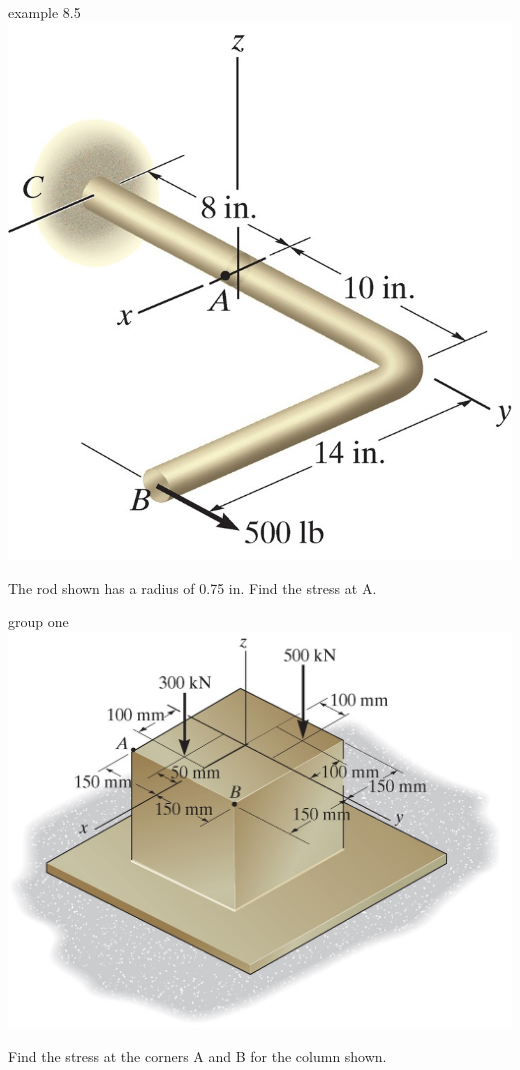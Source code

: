 \documentclass[
  letterpaper,
  ignorenonframetext,
  aspectratio=43,
  handout,
  12pt]{beamer}
\let\Oldincludegraphics\includegraphics
\renewcommand{\includegraphics}[2][]{\Oldincludegraphics[width=\textwidth,height=0.7\textheight,keepaspectratio]{#2}}
\begin{document}
\begin{frame}{example 8.5}
\protect\hypertarget{example-8.5}{}
\includegraphics{../images/example-8-5.jpg}

The rod shown has a radius of 0.75 in. Find the stress at A.
\end{frame}

\begin{frame}{group one}
\protect\hypertarget{group-one}{}
\includegraphics{../images/group-8-1.jpg}

Find the stress at the corners A and B for the column shown.
\end{frame}
\end{document}
